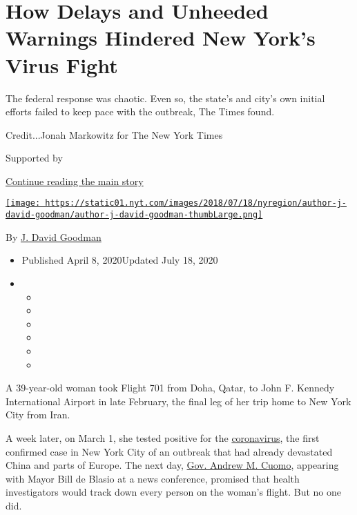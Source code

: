 \hypertarget{how-delays-and-unheeded-warnings-hindered-new-yorks-virus-fight}{%
\section{How Delays and Unheeded Warnings Hindered New York's Virus
Fight}\label{how-delays-and-unheeded-warnings-hindered-new-yorks-virus-fight}}

The federal response was chaotic. Even so, the state's and city's own
initial efforts failed to keep pace with the outbreak, The Times found.

Credit...Jonah Markowitz for The New York Times

Supported by

\protect\hyperlink{after-sponsor}{Continue reading the main story}

\href{https://www.nytimes.com/by/j-david-goodman}{\texttt{[image: https://static01.nyt.com/images/2018/07/18/nyregion/author-j-david-goodman/author-j-david-goodman-thumbLarge.png]}}

By \href{https://www.nytimes.com/by/j-david-goodman}{J. David Goodman}

\begin{itemize}
\item
  Published April 8, 2020Updated July 18, 2020
\item
  \begin{itemize}
  \item
  \item
  \item
  \item
  \item
  \item
  \end{itemize}
\end{itemize}

A 39-year-old woman took Flight 701 from Doha, Qatar, to John F. Kennedy
International Airport in late February, the final leg of her trip home
to New York City from Iran.

A week later, on March 1, she tested positive for the
\href{https://www.nytimes.com/2020/07/13/upshot/coronavirus-response-fax-machines.html}{coronavirus},
the first confirmed case in New York City of an outbreak that had
already devastated China and parts of Europe. The next day,
\href{https://www.nytimes.com/2020/04/09/style/cuomo-ny-tough-video-coronavirus.html}{Gov.
Andrew M. Cuomo}, appearing with Mayor Bill de Blasio at a news
conference, promised that health investigators would track down every
person on the woman's flight. But no one did.

